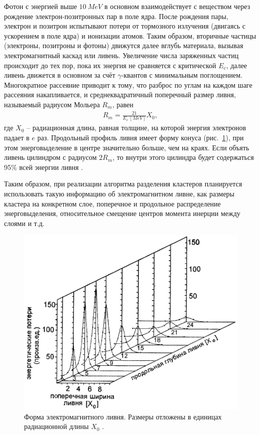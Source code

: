 \documentclass[14pt]{extarticle}
\begin{document}
Фотон с энергией выше $10\:MeV$ в основном взаимодействует с веществом через рождение электрон-позитронных пар в поле ядра.
После рождения пары, электрон и позитрон испытывают потери от тормозного излучения (двигаясь с ускорением в поле ядра) и ионизации атомов. Таким образом, вторичные частицы (электроны, позитроны и фотоны) движутся далее вглубь материала, вызывая электромагнитный каскад или ливень. Увеличение числа заряженных частиц происходит до тех пор, пока их энергия не сравняется с критической $E_c$, далее ливень движется в основном за счёт $\gamma$-квантов с минимальным поглощением. Многократное рассеяние приводит к тому, что разброс по углам на каждом шаге рассеяния накапливается, и среднеквадратичный поперечный размер ливня, называемый радиусом Мольера $R_m$, равен
\begin{align*}
    R_m = \frac{21}{E_c~[MeV]} X_0,
\end{align*}
где $X_0$ -- радиационная длина, равная толщине, на которой энергия электронов падает в $e$ раз.
Продольный профиль ливня имеет форму конуса (рис.~\ref{fig:avalanche}), при этом энерговыделение в центре значительно больше, чем на краях. Если объять ливень цилиндром с радиусом $2 R_m$, то внутри этого цилиндра будет содержаться 95\% всей энергии ливня \cite{grupen, onuchin}.

Таким образом, при реализации алгоритма разделения кластеров планируется использовать такую информацию об электромагнитном ливне, как размеры кластера на конкретном слое, поперечное и продольное распределение энерговыделения, относительное смещение центров момента инерции между слоями и т.д.

\begin{figure}[h!]
	\centering
	\includegraphics[width=0.8\linewidth]{../pics/avalanche.png}
	\caption{Форма электромагнитного ливня. Размеры отложены в единицах радиационной длины $X_0$ \cite{grupen}.}
	\label{fig:avalanche}
\end{figure}
\end{document}
